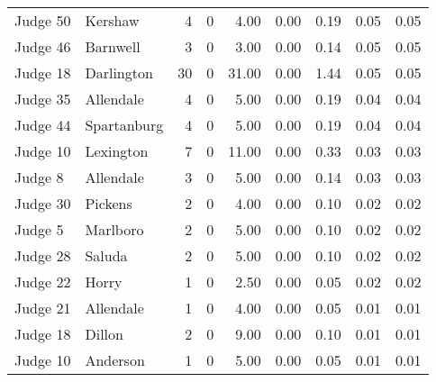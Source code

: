 \begin{tabular}{llrrrrrrr}
Judge 50 &      Kershaw &     4 &      0 &  4.00 &       0.00 &      0.19 &         0.05 &      0.05 \\
Judge 46 &     Barnwell &     3 &      0 &  3.00 &       0.00 &      0.14 &         0.05 &      0.05 \\
Judge 18 &   Darlington &    30 &      0 & 31.00 &       0.00 &      1.44 &         0.05 &      0.05 \\
Judge 35 &    Allendale &     4 &      0 &  5.00 &       0.00 &      0.19 &         0.04 &      0.04 \\
Judge 44 &  Spartanburg &     4 &      0 &  5.00 &       0.00 &      0.19 &         0.04 &      0.04 \\
Judge 10 &    Lexington &     7 &      0 & 11.00 &       0.00 &      0.33 &         0.03 &      0.03 \\
 Judge 8 &    Allendale &     3 &      0 &  5.00 &       0.00 &      0.14 &         0.03 &      0.03 \\
Judge 30 &      Pickens &     2 &      0 &  4.00 &       0.00 &      0.10 &         0.02 &      0.02 \\
 Judge 5 &     Marlboro &     2 &      0 &  5.00 &       0.00 &      0.10 &         0.02 &      0.02 \\
Judge 28 &       Saluda &     2 &      0 &  5.00 &       0.00 &      0.10 &         0.02 &      0.02 \\
Judge 22 &        Horry &     1 &      0 &  2.50 &       0.00 &      0.05 &         0.02 &      0.02 \\
Judge 21 &    Allendale &     1 &      0 &  4.00 &       0.00 &      0.05 &         0.01 &      0.01 \\
Judge 18 &       Dillon &     2 &      0 &  9.00 &       0.00 &      0.10 &         0.01 &      0.01 \\
Judge 10 &     Anderson &     1 &      0 &  5.00 &       0.00 &      0.05 &         0.01 &      0.01 \\
\bottomrule
\end{tabular}
